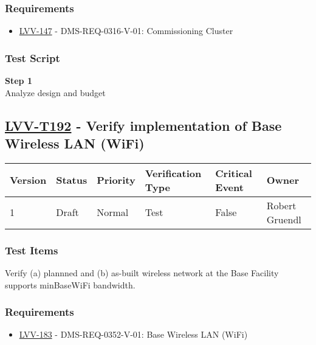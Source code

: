 \subsubsection{Requirements}\label{requirements-50}

\begin{itemize}
\tightlist
\item
  \href{https://jira.lsstcorp.org/browse/LVV-147}{LVV-147} -
  DMS-REQ-0316-V-01: Commissioning Cluster
\end{itemize}

\subsubsection{Test Script}\label{test-script-50}

\textbf{Step 1}\\
Analyze design and budget\\[2\baselineskip]

\hypertarget{lvv-t192---verify-implementation-of-base-wireless-lan-wifi}{\subsection{\texorpdfstring{\href{https://jira.lsstcorp.org/secure/Tests.jspa\#/testCase/LVV-T192}{LVV-T192}
- Verify implementation of Base Wireless LAN
(WiFi)}{LVV-T192 - Verify implementation of Base Wireless LAN (WiFi)}}\label{lvv-t192---verify-implementation-of-base-wireless-lan-wifi}}

\begin{longtable}[]{@{}llllll@{}}
\toprule
Version & Status & Priority & Verification Type & Critical Event &
Owner\tabularnewline
\midrule
\endhead
1 & Draft & Normal & Test & False & Robert Gruendl\tabularnewline
\bottomrule
\end{longtable}

\subsubsection{Test Items}\label{test-items-51}

Verify (a) plannned and (b) as-built wireless network at the Base
Facility supports minBaseWiFi bandwidth.

\subsubsection{Requirements}\label{requirements-51}

\begin{itemize}
\tightlist
\item
  \href{https://jira.lsstcorp.org/browse/LVV-183}{LVV-183} -
  DMS-REQ-0352-V-01: Base Wireless LAN (WiFi)
\end{itemize}


